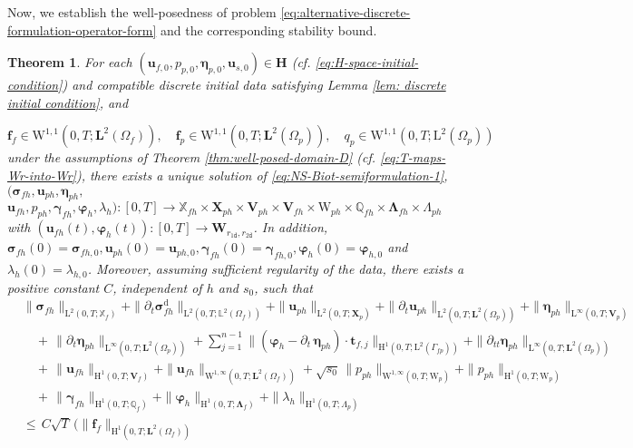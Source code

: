 \documentclass[11pt]{article}
\numberwithin{equation}{section}
\newcommand{\bgamma}{{\boldsymbol\gamma}}
\newcommand{\bLambda}{{\boldsymbol\Lambda}}
\newcommand{\bbeta}{{\boldsymbol\eta}}
\newcommand{\bsi}{{\boldsymbol\sigma}}
\newcommand{\bvarphi}{{\boldsymbol\varphi}}
\newcommand{\f}{\mathbf{f}}
\newcommand{\bu}{\mathbf{u}}
\newcommand{\bt}{{\mathbf{t}}}
\newcommand{\0}{{\mathbf{0}}}
\def\bX{\mathbf{X}}
\def\bV{\mathbf{V}}
\def\bW{\mathbf{W}}
\newcommand{\bL}{\mathbf{L}}
\newcommand\bH{\mathbf{H}}
\newcommand\bbQ{\mathbb{Q}}
\newcommand\bbX{\mathbb{X}}
\newcommand\bbL{\mathbb{L}}
\def\H{\mathrm{H}}
\def\L{\mathrm{L}}
\def\W{\mathrm{W}}
\def\rd{\mathrm{d}}
\def\ttd{\mathtt{d}}
\newtheorem{thm}{Theorem}[section]
\numberwithin{equation}{section}
\begin{document}
Now, we establish the well-posedness of problem \eqref{eq:alternative-discrete-formulation-operator-form} and the corresponding stability bound.
%
\begin{thm}\label{thm: well-posedness main result semi}
For each $(\bu_{f,0}, p_{p,0}, \bbeta_{p,0}, \bu_{s,0}) \in \bH$ (cf. \eqref{eq:H-space-initial-condition}) and compatible discrete initial data satisfying Lemma \ref{lem: discrete initial condition}, and

\begin{equation*}
\f_f\in \W^{1,1}(0,T;\bL^2(\Omega_f)),\quad \f_p\in \W^{1,1}(0,T;\bL^2(\Omega_p)),\quad q_p\in \W^{1,1}(0,T;\L^2(\Omega_p))
\end{equation*}
under the assumptions of Theorem \ref{thm:well-posed-domain-D} (cf. \eqref{eq:T-maps-Wr-into-Wr}), there exists a unique solution of \eqref{eq:NS-Biot-semiformulation-1}, $(\bsi_{fh},\bu_{ph},\bbeta_{ph},$ 
$\bu_{fh}, p_{ph}, \bgamma_{fh}, \bvarphi_h, \lambda_h) : [0,T]\to \bbX_{fh}\times \bX_{ph}\times\bV_{ph}\times\bV_{fh}\times \W_{ph}\times \bbQ_{fh}\times \bLambda_{fh}\times \Lambda_{ph}$  with $(\bu_{fh}(t),\bvarphi_{h}(t)):[0,T]\to \bW_{r_{1\ttd},r_{2\ttd}}$. 
In addition, $\bsi_{fh}(0) = \bsi_{fh,0}, \bu_{ph}(0) = \bu_{ph,0},  \bgamma_{fh}(0) = \bgamma_{fh,0}, \bvarphi_{h}(0) = \bvarphi_{h,0}$ and $\lambda_{h}(0) = \lambda_{h,0}$. 
Moreover, assuming sufficient regularity of the data, there exists a positive constant $C$, independent of $h$ and $s_0$, such that
\begin{align}
&\|\bsi_{fh}\|_{\L^2(0,T;\bbX_f)} 
+ \|\partial_t\bsi^\rd_{fh}\|_{\L^2(0,T;\bbL^2(\Omega_f))}
+ \|\bu_{ph}\|_{\L^2(0,T;\bX_p)} 
+ \| \partial_t\bu_{ph}\|_{\L^2(0,T;\bL^2(\Omega_p))}
+ \|\bbeta_{ph}\|_{\L^\infty(0,T;\bV_p)} 
\nonumber \\
&\quad +\, \|\partial_t\bbeta_{ph}\|_{\L^\infty(0,T;\bL^2(\Omega_p))}
+ \sum^{n-1}_{j=1} \|(\bvarphi_h-\partial_t\,\bbeta_{ph})\cdot\bt_{f,j}\|_{\H^1(0,T;\L^2(\Gamma_{fp}))}
+ \|\partial_{tt}\bbeta_{ph}\|_{\L^\infty(0,T;\bL^2(\Omega_p))}
\nonumber \\[1ex]
&\quad +\, \|\bu_{fh}\|_{\H^1(0,T;\bV_f)}
+ \|\bu_{fh}\|_{\W^{1,\infty}(0,T;\bL^2(\Omega_f))}
+ \sqrt{s_0}\,\|p_{ph}\|_{\W^{1,\infty}(0,T;\W_p)}
+ \|p_{ph}\|_{\H^1(0,T;\W_p)}
\nonumber \\[1ex]
&\quad +\, \|\bgamma_{fh}\|_{\H^1(0,T;\bbQ_f)} 
+ \|\bvarphi_h\|_{\H^1(0,T;\bLambda_f)} 
+ \|\lambda_h\|_{\H^1(0,T;\Lambda_p)} 
\nonumber \\
&\leq\, C \sqrt{T}\,\Bigg( \|\f_f\|_{\H^1(0,T;\bL^2(\Omega_f))}  

\end{align}
\end{thm}
\end{document}
